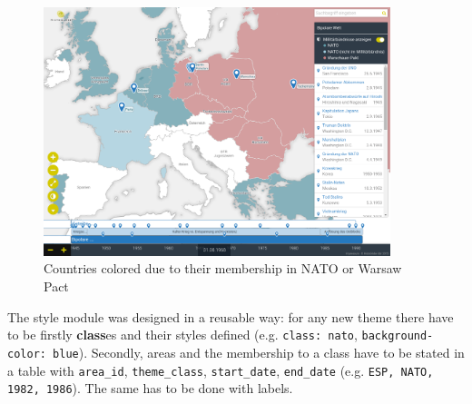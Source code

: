 \begin{figure}[H]
  \begin{center}
    \includegraphics[width=0.9\textwidth]{graphics/bipolar_world.png}
  \end{center}
  \caption{Countries colored due to their membership in NATO or Warsaw Pact}
  \label{fig:biplar_world}
\end{figure}

The style module was designed in a reusable way: for any new theme there have to be firstly \textbf{class}es and their styles defined (e.g. \texttt{class: nato}, \texttt{background-color: blue}). Secondly, areas and the membership to a class have to be stated in a table with \texttt{area\_id}, \texttt{theme\_class}, \texttt{start\_date}, \texttt{end\_date} (e.g. \texttt{ESP, NATO, 1982, 1986}). The same has to be done with labels.




